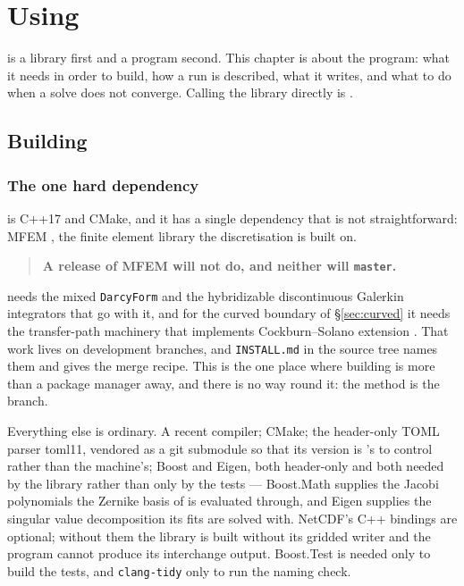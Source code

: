 \chapter{Using \meq}
\label{ch:using}

{\meq} is a library first and a program second. This chapter is about the
program: what it needs in order to build, how a run is described, what it
writes, and what to do when a solve does not converge. Calling the library
directly is .

\section{Building}

\subsection{The one hard dependency}

{\meq} is C++17 and CMake, and it has a single dependency that is not
straightforward: MFEM \cite{Anderson2021}, the finite element library the
discretisation is built on.

\begin{quote}
	\textbf{A release of MFEM will not do, and neither will \texttt{master}.}
\end{quote}

{\meq} needs the mixed \texttt{DarcyForm} and the hybridizable discontinuous
Galerkin integrators that go with it, and for the curved boundary of
\S\ref{sec:curved} it needs the transfer-path machinery that implements
Cockburn--Solano extension \cite{CockburnSolano2012}. That work lives on
development branches, and \texttt{INSTALL.md} in the source tree names them and
gives the merge recipe. This is the one place where building {\meq} is more
than a package manager away, and there is no way round it: the method is the
branch.

Everything else is ordinary. A recent compiler; CMake; the header-only TOML
parser toml11, vendored as a git submodule so that its version is {\meq}'s to
control rather than the machine's; Boost and Eigen, both header-only and both
needed by the library rather than only by the tests --- Boost.Math supplies the
Jacobi polynomials the Zernike basis of  is evaluated
through, and Eigen supplies the singular value decomposition its fits are solved
with. NetCDF's C++ bindings are optional; without them the library is built
without its gridded writer and the program cannot produce its interchange
output. Boost.Test is needed only to build the tests, and \texttt{clang-tidy}
only to run the naming check.

